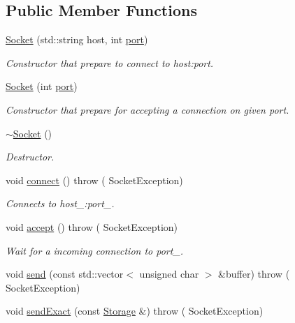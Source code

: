 \subsection*{Public Member Functions}
\begin{DoxyCompactItemize}
\item 
\hyperlink{classtcpip_1_1_socket_adcf673cc4a6e4183f4a6f0929e13c5c1}{Socket} (std\+::string host, int \hyperlink{classtcpip_1_1_socket_ab7e67c84c32557ffb98d940081497d67}{port})
\begin{DoxyCompactList}\small\item\em Constructor that prepare to connect to host\+:port. \end{DoxyCompactList}\item 
\hyperlink{classtcpip_1_1_socket_af92b0e4bfc335b36971e94baa19fa017}{Socket} (int \hyperlink{classtcpip_1_1_socket_ab7e67c84c32557ffb98d940081497d67}{port})
\begin{DoxyCompactList}\small\item\em Constructor that prepare for accepting a connection on given port. \end{DoxyCompactList}\item 
\hyperlink{classtcpip_1_1_socket_a610c213f4b2fad07cc0bfddc3a5577e4}{$\sim$\+Socket} ()
\begin{DoxyCompactList}\small\item\em Destructor. \end{DoxyCompactList}\item 
void \hyperlink{classtcpip_1_1_socket_a8f89d187776729d15db3ba5c99c36acd}{connect} ()  throw ( Socket\+Exception)
\begin{DoxyCompactList}\small\item\em Connects to host\+\_\+\+:port\+\_\+. \end{DoxyCompactList}\item 
void \hyperlink{classtcpip_1_1_socket_a7847299f806a73798f4ceb95ab0e3d51}{accept} ()  throw ( Socket\+Exception)
\begin{DoxyCompactList}\small\item\em Wait for a incoming connection to port\+\_\+. \end{DoxyCompactList}\item 
void \hyperlink{classtcpip_1_1_socket_acb91f20e7a532159a8daa2796fa4abd4}{send} (const std\+::vector$<$ unsigned char $>$ \&buffer)  throw ( Socket\+Exception)
\item 
void \hyperlink{classtcpip_1_1_socket_a6d00027b40f48d4ae19e3fff2e89f7ab}{send\+Exact} (const \hyperlink{classtcpip_1_1_storage}{Storage} \&)  throw ( Socket\+Exception)

\end{DoxyCompactItemize}
